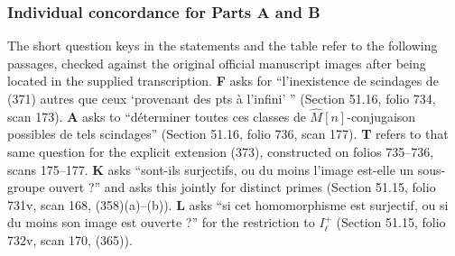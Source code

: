 \subsubsection*{Individual concordance for Parts A and B}
The short question keys in the statements and the table refer to the
following passages, checked against the original official manuscript images
after being located in the supplied transcription. \textbf{F}
asks for ``l'inexistence de scindages de (371) autres que ceux
`provenant des pts \`a l'infini' '' (Section 51.16, folio 734, scan 173).
\textbf{A} asks to ``d\'eterminer toutes ces classes de
$\widehat M[n]$-conjugaison possibles de tels scindages'' (Section 51.16,
folio 736, scan 177). \textbf{T} refers to that same question for the
explicit extension (373), constructed on folios 735--736, scans 175--177.
\textbf{K} asks ``sont-ils surjectifs, ou du moins l'image est-elle un
sous-groupe ouvert ?'' and asks this jointly for distinct primes
(Section 51.15, folio 731v, scan 168, (358)(a)--(b)). \textbf{L} asks
``si cet homomorphisme est surjectif, ou si du moins son image est
ouverte ?'' for the restriction to $I_\ell^+$ (Section 51.15,
folio 732v, scan 170, (365)).

